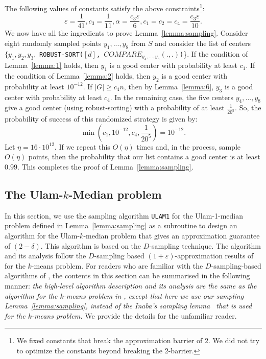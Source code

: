 \documentclass[11pt]{llncs}
\newcommand{\veps}{\varepsilon}
\begin{document}
The following values of constants satisfy the above constraints\footnote{We fixed constants that break the approximation barrier of 2. We did not try to optimize the constants beyond breaking the 2-barrier.}:
$$
\veps = \frac{1}{41}, c_3 = \frac{1}{11}, \alpha = \frac{c_3 \veps}{6}, c_1 = c_2 = c_4 = \frac{c_3 \veps}{10}.
$$
We now have all the ingredients to prove Lemma~\ref{lemma:sampling}. Consider eight randomly sampled points $y_1, ..., y_8$ from $S$ and consider the list of centers $\{y_1, y_2, y_3,$ {\tt ROBUST-SORT(\tt {$[d]$, $COMPARE_{y_4, ..., y_8}(., .)$})}\}. If the condition of Lemma~\ref{lemma:1} holds, then $y_1$ is a good center with probability at least $c_1$. If the condition of Lemma~\ref{lemma:2} holds, then $y_2$ is a good center with probability at least $10^{-12}$. If $|G| \geq c_4 n$, then by Lemma~\ref{lemma:6}, $y_3$ is a good center with probability at least $c_4$. In the remaining case, the five centers $y_4, ..., y_8$ give a good center (using robust-sorting) with a probability of at least $\frac{1}{20^5}$.
So, the probability of success of this randomized strategy is given by: 
$$
\min{\left(c_1, 10^{-12}, c_4, \frac{1}{20^5} \right)} = 10^{-12}.
$$
Let $\eta =16 \cdot 10^{12}$. If we repeat this $O(\eta)$ times and, in the process, sample $O(\eta)$ points, then the probability that our list contains a good center is at least $0.99$. This completes the proof of Lemma~\ref{lemma:sampling}.



















\subsection{The Ulam-$k$-Median problem}
In this section, we use the sampling algorithm {\tt ULAM1} for the Ulam-1-median problem defined in Lemma~\ref{lemma:sampling} as a subroutine to design an algorithm for the Ulam-$k$-median problem that gives an approximation guarantee of $(2-\delta)$. 
This algorithm is based on the $D$-sampling technique.
The algorithm and its analysis follow the $D$-sampling based $(1+\veps)$-approximation results of \cite{jks} for the $k$-means problem.
For readers who are familiar with the $D$-sampling-based algorithms of \cite{jks}, the contents in this section can be summarised in the following manner: {\it the high-level algorithm description and its analysis are the same as the algorithm for the $k$-means problem in \cite{jks}, except that here we use our sampling Lemma~\ref{lemma:sampling}, instead of the Inaba's sampling lemma~\cite{inaba} that is used for the $k$-means problem.}
We provide the details for the unfamiliar reader.
\end{document}
